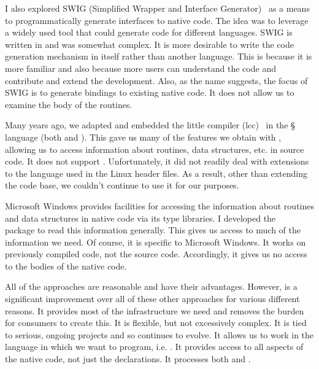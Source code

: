 I also explored SWIG (Simplified Wrapper and Interface
Generator)~\cite{bib:SWIG} as a means to programmatically generate
interfaces to native code. The idea was to leverage a widely used tool
that could generate code for different languages.  SWIG is written in
\perl{} and was somewhat complex. It is more desirable to write the
code generation mechanism in \R{} itself rather than another language.
This is because it is more familiar and also because more users can
understand the code and contribute and extend the development.  Also,
as the name suggests, the focus of SWIG is to generate bindings to
existing native code.  It does not allow us to examine the body of the
routines.


Many years ago, we adapted and embedded the little \C{} compiler
(lcc)~\cite{bib:lcc} in the \S{} language (both \R{} and \Splus).  This gave us many of the
features we obtain with \libclang, allowing us to access information
about routines, data structures, etc. in source code.  It does not
support \Cpp. Unfortunately, it did not readily deal with extensions
to the \C{} language used in the Linux header files. As a result,
other than extending the code base, we couldn't continue to use it for
our purposes.
 
Microsoft Windows provides facilities for accessing the information
about routines and data structures in native code via its type
libraries.  I developed the
~\cite{bib:SWinTypeLibs} package to read this
information generally. This gives us access to much of the information
we need. Of course, it is specific to Microsoft Windows. It works on
previously compiled code, not the source code.  Accordingly, it gives
us no access to the bodies of the native code.



All of the approaches are reasonable and have their
advantages. However, \libclang{} is a significant improvement over all
of these other approaches for various different reasons. It provides
most of the infrastructure we need and removes the burden for
consumers to create this.  It is flexible, but not excessively complex.
It is tied to serious, ongoing projects and so continues to evolve. It
allows us to work in the language in which we want to program,
i.e. \R.  It provides access to all aspects of the native code, not
just the declarations. It processes both \C{} and \Cpp.

